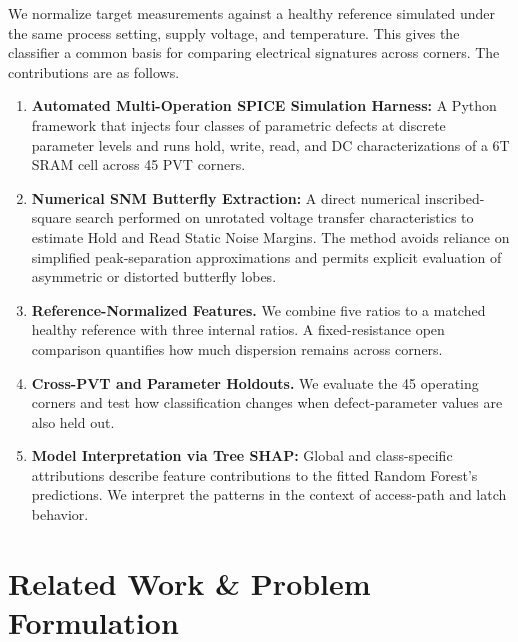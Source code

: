 \documentclass[conference]{IEEEtran}
\begin{document}
We normalize target measurements against a healthy reference simulated under the same process setting, supply voltage, and temperature. This gives the classifier a common basis for comparing electrical signatures across corners. The contributions are as follows.
\begin{enumerate}
    \item \textbf{Automated Multi-Operation SPICE Simulation Harness:} A Python framework that injects four classes of parametric defects at discrete parameter levels and runs hold, write, read, and DC characterizations of a 6T SRAM cell across 45 PVT corners.
    \item \textbf{Numerical SNM Butterfly Extraction:} A direct numerical inscribed-square search performed on unrotated voltage transfer characteristics to estimate Hold and Read Static Noise Margins. The method avoids reliance on simplified peak-separation approximations and permits explicit evaluation of asymmetric or distorted butterfly lobes.
    \item \textbf{Reference-Normalized Features.} We combine five ratios to a matched healthy reference with three internal ratios. A fixed-resistance open comparison quantifies how much dispersion remains across corners.
    \item \textbf{Cross-PVT and Parameter Holdouts.} We evaluate the 45 operating corners and test how classification changes when defect-parameter values are also held out.
    \item \textbf{Model Interpretation via Tree SHAP:} Global and class-specific attributions describe feature contributions to the fitted Random Forest's predictions. We interpret the patterns in the context of access-path and latch behavior.
\end{enumerate}


\section{Related Work \& Problem Formulation}
\label{sec:related}
\end{document}
